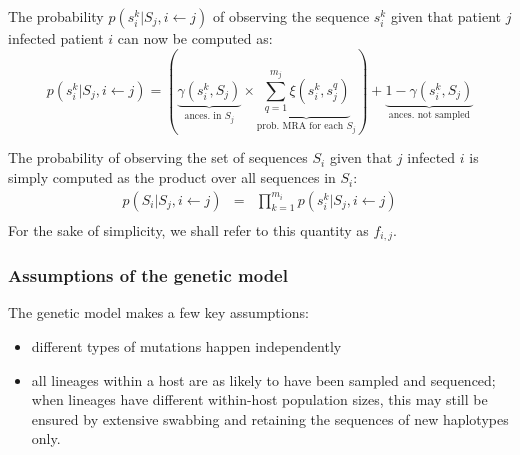 \documentclass[10pt]{article}
\begin{document}
The probability $p(s_i^k | S_j, i \leftarrow j)$ of observing the sequence $s_i^k$ given that patient $j$ infected patient $i$ can now be computed as:
$$
p(s_i^k | S_j, i \leftarrow j) = 
(\underbrace{\gamma(s_i^k, S_j)}_{\mbox{ances. in }S_j} \times 
\underbrace{\sum_{q=1}^{m_j}\xi(s_i^k, s_j^q)}_{\mbox{prob. MRA for each }S_j} ) + 
\underbrace{1 - \gamma(s_i^k, S_j)}_{\mbox{ances. not sampled}}
$$


The probability of observing the set of sequences $S_i$ given that $j$ infected $i$ is simply computed as the product over all sequences in $S_i$:
\begin{eqnarray*}
p(S_i | S_j, i \leftarrow j) & = & \prod_{k=1}^{m_i} p(s_i^k | S_j, i \leftarrow j) \\
\end{eqnarray*}
For the sake of simplicity, we shall refer to this quantity as $f_{i,j}$.
\\


\subsubsection*{Assumptions of the genetic model}
The genetic model makes a few key assumptions:
\begin{itemize}
 \item different types of mutations happen independently
 \item all lineages within a host are as likely to have been sampled and sequenced; when lineages have different within-host population sizes, this may still be ensured by extensive swabbing and retaining the sequences of new haplotypes only.
\end{itemize}


\end{document}
